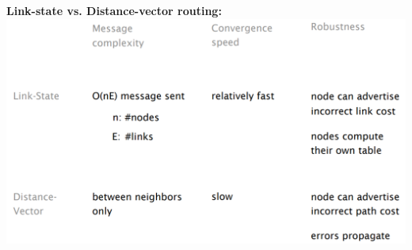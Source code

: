 \documentclass[a4paper, fontsize=8pt, landscape, DIV=1]{scrartcl}
\begin{document}
\begin{multicols*}{4}
		\textbf{Link-state vs. Distance-vector routing:}\\
		\includegraphics[width=\columnwidth]{images/Network_Layer/state_vs_vector.png}
		

\end{multicols*}
\end{document}
